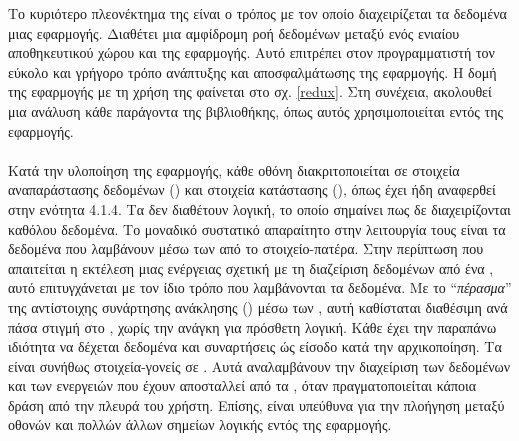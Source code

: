 Το κυριότερο πλεονέκτημα της  είναι ο τρόπος με τον οποίο διαχειρίζεται τα δεδομένα μιας εφαρμογής. Διαθέτει μια αμφίδρομη ροή δεδομένων μεταξύ ενός ενιαίου αποθηκευτικού χώρου και της εφαρμογής. Αυτό επιτρέπει στον προγραμματιστή τον εύκολο και γρήγορο τρόπο ανάπτυξης και αποσφαλμάτωσης της εφαρμογής.
\newline
\indent
Η δομή της εφαρμογής με τη χρήση της  φαίνεται στο σχ. \ref{redux}. Στη συνέχεια, ακολουθεί μια ανάλυση κάθε παράγοντα της βιβλιοθήκης, όπως αυτός χρησιμοποιείται εντός της εφαρμογής.

 \paragraph{}
 \paragraph{}
 Κατά την υλοποίηση της εφαρμογής, κάθε οθόνη διακριτοποιείται σε στοιχεία αναπαράστασης δεδομένων () και στοιχεία κατάστασης (), όπως έχει ήδη αναφερθεί στην ενότητα 4.1.4. Τα  δεν διαθέτουν λογική, το οποίο σημαίνει πως δε διαχειρίζονται καθόλου δεδομένα. Το μοναδικό συστατικό απαραίτητο στην λειτουργία τους είναι τα δεδομένα που λαμβάνουν μέσω των  από το στοιχείο-πατέρα. Στην περίπτωση που απαιτείται η εκτέλεση μιας ενέργειας σχετική με τη διαζείριση δεδομένων από ένα , αυτό επιτυγχάνεται με τον ίδιο τρόπο που λαμβάνονται τα δεδομένα. Με το ``\textit{πέρασμα}'' της αντίστοιχης συνάρτησης ανάκλησης () μέσω των , αυτή καθίσταται διαθέσιμη ανά πάσα στιγμή στο , χωρίς την ανάγκη για πρόσθετη λογική. Κάθε  έχει την παραπάνω ιδιότητα να δέχεται δεδομένα και συναρτήσεις ώς είσοδο κατά την αρχικοποίηση.
\newline
\indent
Τα  είναι συνήθως στοιχεία-γονείς σε . Αυτά αναλαμβάνουν την διαχείριση των δεδομένων και των ενεργειών που έχουν αποσταλλεί από τα , όταν πραγματοποιείται κάποια δράση από την πλευρά του χρήστη. Επίσης, είναι υπεύθυνα για την πλοήγηση μεταξύ οθονών και πολλών άλλων σημείων λογικής εντός της εφαρμογής. 

\clearpage
 \paragraph{}
